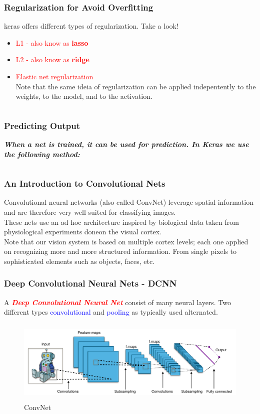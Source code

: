 \documentclass[aspectratio=169]{beamer}
\begin{document}
\begin{frame}
\frametitle{Regularization for Avoid Overfitting}
keras offers different types of regularization. Take a look! 
\\[0.3cm]
\begin{itemize}
\item \textcolor{red}{L1 - also know as \textbf{lasso}}
\item \textcolor{red}{L2 - also know as \textbf{ridge}}
\item \textcolor{red}{Elastic net regularization}
\\[0.3cm]
Note that the same ideia of regularization can be applied indepentently to the weights, to the model, and to the activation.
\inputminted{python}{twentythree.py} 
\end{itemize}
\end{frame}

\begin{frame}
\frametitle{Predicting Output}
\textbf{\emph{When a net is trained, it can be used for prediction. In Keras we use the following method:}}
\inputminted{python}{twentyfour.py}
\end{frame}

\begin{frame}
\frametitle{An Introduction to Convolutional Nets}
Convolutional neural networks (also called ConvNet) leverage spatial information and are therefore very well suited for classifying images.
\\[0.3cm]
These nets use an ad hoc architecture inspired by biological data taken from physiological experiments doneon the visual cortex. 
\\[0.3cm]
Note that our vision system is based on multiple cortex levels; each one applied on recognizing more and more structured information. From single pixels to sophisticated elements such as objects, faces, etc. 
\end{frame}

\begin{frame}
\frametitle{Deep Convolutional Neural Nets - DCNN}
A \textbf{\emph{\textcolor{red}{Deep Convolutional Neural Net}}} consist of many neural layers. Two different types \textcolor{blue}{convolutional} and \textcolor{blue}{pooling} as typically used alternated.
\begin{figure}
\includegraphics[width=15cm,height=4cm]{two.jpg}
\caption{ConvNet}
\label{fig:ConvNet Digits}
\end{figure}
\end{frame}
\end{document}
